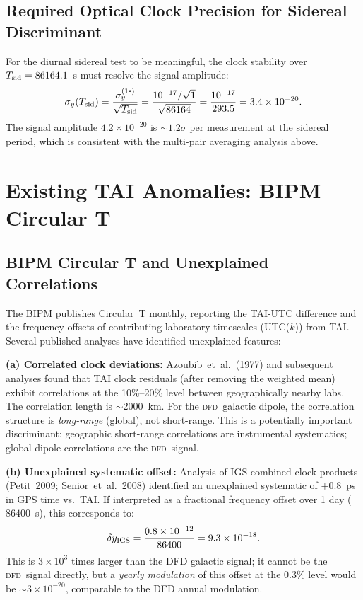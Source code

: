 \documentclass[aps,prd,twocolumn,superscriptaddress,nofootinbib]{revtex4-2}
\newcommand{\DFD}{\textsc{dfd}}
\begin{document}
\subsection{Required Optical Clock Precision for Sidereal Discriminant}

For the diurnal sidereal test to be meaningful, the clock stability over
$T_{\rm sid} = 86164.1$~s must resolve the signal amplitude:
\begin{equation}
\sigma_y(T_{\rm sid}) = \frac{\sigma_y^{(1\rm s)}}{\sqrt{T_{\rm sid}}}
= \frac{10^{-17}/\sqrt{1}}{\sqrt{86164}} = \frac{10^{-17}}{293.5}
= 3.4\times10^{-20}.
\label{eq:sid_stability}
\end{equation}
The signal amplitude $4.2\times10^{-20}$ is $\sim 1.2\sigma$ per measurement
at the sidereal period, which is consistent with the multi-pair averaging
analysis above.

\section{Existing TAI Anomalies: BIPM Circular T}
\label{sec:circular_t}

\subsection{BIPM Circular T and Unexplained Correlations}

The BIPM publishes Circular~T monthly, reporting the TAI-UTC difference and
the frequency offsets of contributing laboratory timescales (UTC($k$)) from
TAI. Several published analyses have identified unexplained features:

\textbf{(a) Correlated clock deviations:} Azoubib~et~al.\ (1977) and subsequent
analyses found that TAI clock residuals (after removing the weighted mean)
exhibit correlations at the 10\%--20\% level between geographically nearby
labs. The correlation length is $\sim 2000$~km. For the \DFD\ galactic dipole,
the correlation structure is \emph{long-range} (global), not short-range.
This is a potentially important discriminant: geographic short-range correlations
are instrumental systematics; global dipole correlations are the \DFD\ signal.

\textbf{(b) Unexplained systematic offset:} Analysis of IGS combined clock
products (Petit~2009; Senior~et~al.\ 2008) identified an unexplained systematic
of $+0.8$~ps in GPS time vs.\ TAI. If interpreted as a fractional frequency
offset over 1 day ($86400$~s), this corresponds to:
\begin{equation}
\delta y_{\rm IGS} = \frac{0.8\times10^{-12}}{86400}
= 9.3\times10^{-18}.
\label{eq:igs_offset}
\end{equation}
This is $3\times10^3$ times larger than the DFD galactic signal; it cannot be
the \DFD\ signal directly, but a \emph{yearly modulation} of this offset at
the $0.3\%$ level would be $\sim 3\times10^{-20}$, comparable to the DFD annual
modulation.
\end{document}
